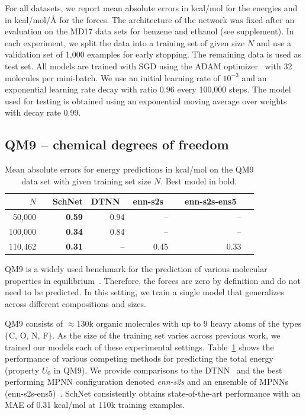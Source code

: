 \documentclass{article}
\begin{document}
For all datasets, we report mean absolute errors in kcal/mol for the energies and in kcal/mol/{\AA} for the forces. The architecture of the network was fixed after an evaluation on the MD17 data sets for benzene and ethanol (see supplement).
In each experiment, we split the data into a training set of given size $N$ and use a validation set of 1,000 examples for early stopping. The remaining data is used as test set.
All models are trained with SGD using the ADAM optimizer~\citep{KingmaB14} with 32 molecules per mini-batch.
We use an initial learning rate of $10^{-3}$ and an exponential learning rate decay with ratio $0.96$ every 100,000 steps. The model used for testing is obtained using an exponential moving average over weights with decay rate 0.99.

\subsection{QM9 -- chemical degrees of freedom}
\begin{table}
\caption{Mean absolute errors for energy predictions in kcal/mol on the QM9 data set with given training set size $N$. Best model in bold.}\label{tab:qm9}
\centering
\small
\begin{tabular}{rrrrrrrr}
\toprule
$N$ & & SchNet & DTNN~\citep{schutt2017quantum} & enn-s2s~\citep{gilmer2017neural} & & enn-s2s-ens5~\citep{gilmer2017neural}\\ \midrule
50,000  && \textbf{0.59} & 0.94 & --   & &  -- \\
100,000 && \textbf{0.34} & 0.84 & --   & &  -- \\
110,462 && \textbf{0.31} & --   & 0.45 & &  0.33 \\
\bottomrule
\end{tabular}
\end{table}
QM9 is a widely used benchmark for the prediction of various molecular properties in equilibrium~\citep{ramakrishnan2014quantum,blum2009gdb13,reymond2015chemical}.
Therefore, the forces are zero by definition and do not need to be predicted.
In this setting, we train a single model that generalizes across different compositions and sizes.

QM9 consists of $\approx$130k organic molecules with up to 9 heavy atoms of the types $\{$C, O, N, F$\}$. 
As the size of the training set varies across previous work, we trained our models each of these experimental settings.
Table~\ref{tab:qm9} shows the performance of various competing methods for predicting the total energy (property $U_0$ in QM9).
We provide comparisons to the DTNN~\citep{schutt2017quantum} and the best performing MPNN configuration denoted \emph{enn-s2s} and an ensemble of MPNNs (enn-s2s-ens5)~\citep{gilmer2017neural}.
SchNet consistently obtains state-of-the-art performance with an MAE of 0.31 kcal/mol at 110k training examples.
\end{document}

